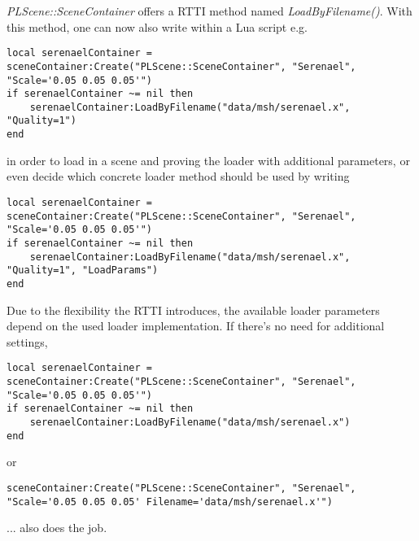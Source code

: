 \emph{PLScene::SceneContainer} offers a RTTI method named \emph{LoadByFilename()}. With this method, one can now also write within a Lua script e.g.
\begin{lstlisting}
local serenaelContainer = sceneContainer:Create("PLScene::SceneContainer", "Serenael", "Scale='0.05 0.05 0.05'")
if serenaelContainer ~= nil then
	serenaelContainer:LoadByFilename("data/msh/serenael.x", "Quality=1")
end
\end{lstlisting}
in order to load in a scene and proving the loader with additional parameters, or even decide which concrete loader method should be used by writing
\begin{lstlisting}
local serenaelContainer = sceneContainer:Create("PLScene::SceneContainer", "Serenael", "Scale='0.05 0.05 0.05'")
if serenaelContainer ~= nil then
	serenaelContainer:LoadByFilename("data/msh/serenael.x", "Quality=1", "LoadParams")
end
\end{lstlisting}
Due to the flexibility the \ac{RTTI} introduces, the available loader parameters depend on the used loader implementation. If there's no need for additional settings,
\begin{lstlisting}
local serenaelContainer = sceneContainer:Create("PLScene::SceneContainer", "Serenael", "Scale='0.05 0.05 0.05'")
if serenaelContainer ~= nil then
	serenaelContainer:LoadByFilename("data/msh/serenael.x")
end
\end{lstlisting}
or
\begin{lstlisting}
sceneContainer:Create("PLScene::SceneContainer", "Serenael", "Scale='0.05 0.05 0.05' Filename='data/msh/serenael.x'")
\end{lstlisting}
...  also does the job.
